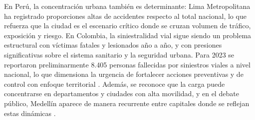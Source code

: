 En Perú, la concentración urbana también es determinante: Lima Metropolitana ha registrado proporciones altas de accidentes respecto al total nacional, lo que refuerza que la ciudad es el escenario crítico donde se cruzan volumen de tráfico, exposición y riesgo. 
En Colombia, la siniestralidad vial sigue siendo un problema estructural con víctimas fatales y lesionados año a año, y con presiones significativas sobre el sistema sanitario y la seguridad urbana. Para 2023 se reportaron preliminarmente 8.405 personas fallecidas por siniestros viales a nivel nacional, lo que dimensiona la urgencia de fortalecer acciones preventivas y de control con enfoque territorial \cite{betancourt2021}. Además, se reconoce que la carga puede concentrarse en departamentos y ciudades con alta movilidad, y en el debate público, Medellín aparece de manera recurrente entre capitales donde se reflejan estas dinámicas \cite{valencia2025}.\\


